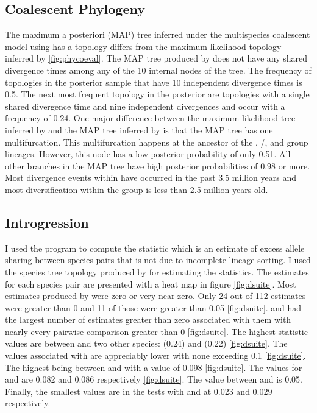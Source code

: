 \subsection{Coalescent Phylogeny}
The maximum a posteriori (MAP) tree inferred under the multispecies coalescent
model using \phycoeval has a topology differs from the maximum likelihood topology 
inferred by \iqtree \cref{fig:phycoeval}.
The MAP tree produced by \phycoeval does not have any shared divergence times 
among any  of the 10 internal nodes of the tree.
The frequency of topologies in the posterior sample that have 10 independent 
divergence times is 0.5.
The next most frequent topology in the posterior are topologies with a single 
shared divergence time and nine independent divergences and occur with a frequency
of 0.24.
One major difference between the maximum likelihood tree inferred by \iqtree and 
the MAP tree inferred by \phycoeval is that the MAP tree has one multifurcation. 
This multifurcation happens at the ancestor of the \quercicus, \speciosus/\cognatus,
and \amer group lineages.
However, this node has a low posterior probability of only 0.51. 
All other branches in the MAP tree have high posterior probabilities of 0.98 or more. 
Most divergence events within \anaxyrus have occurred in the past 3.5 million 
years and most diversification within the \amer group is less than 2.5   
million years old.

\subsection{Introgression}
I used the program \dsuite to compute the \fbranch statistic which is an  
estimate of excess allele sharing between species pairs that is not due to 
incomplete lineage sorting. 
I used the species tree topology produced by \phycoeval for estimating 
the \fbranch statistics. 
The \fbranch estimates for each species pair are presented with a heat map in 
figure \cref{fig:dsuite}.
Most \fbranch estimates produced by \dsuite were zero or very near zero.
Only 24 out of 112 \fbranch estimates were greater than 0 and 11 of those were 
greater than 0.05 \cref{fig:dsuite}.
\amer and \wood had the largest number of estimates greater than
zero associated with them with nearly every pairwise comparison greater than 0
\cref{fig:dsuite}. 
The highest \fbranch statistic values are between \amer and two other 
species: \hemiophrys (0.24) and \baxteri (0.22) \cref{fig:dsuite}.
The values associated with \wood are appreciably lower with none exceeding 
0.1 \cref{fig:dsuite}.
The highest being between \amer and \wood with a value of 0.098 \cref{fig:dsuite}.
The \wood \fbranch values for \baxteri and \hemiophrys are 0.082 and 0.086 
respectively \cref{fig:dsuite}.
The \fbranch value between \wood and \microscaphus is 0.05.
Finally, the smallest \wood \fbranch values are in the tests with \cognatus and 
\speciosus at 0.023 and 0.029 respectively.


